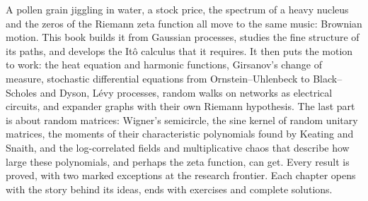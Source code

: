 A pollen grain jiggling in water, a stock price, the spectrum of a heavy nucleus and the zeros of the Riemann zeta function
all move to the same music: Brownian motion. This book builds it from Gaussian processes, studies the fine structure of its
paths, and develops the It\^o calculus that it requires. It then puts the motion to work: the heat equation and harmonic
functions, Girsanov's change of measure, stochastic differential equations from Ornstein--Uhlenbeck to Black--Scholes and
Dyson, L\'evy processes, random walks on networks as electrical circuits, and expander graphs with their own Riemann
hypothesis. The last part is about random matrices: Wigner's semicircle, the sine kernel of random unitary matrices, the
moments of their characteristic polynomials found by Keating and Snaith, and the log-correlated fields and multiplicative
chaos that describe how large these polynomials, and perhaps the zeta function, can get. Every result is proved, with two
marked exceptions at the research frontier. Each chapter opens with the story behind its ideas, ends with exercises and
complete solutions.
